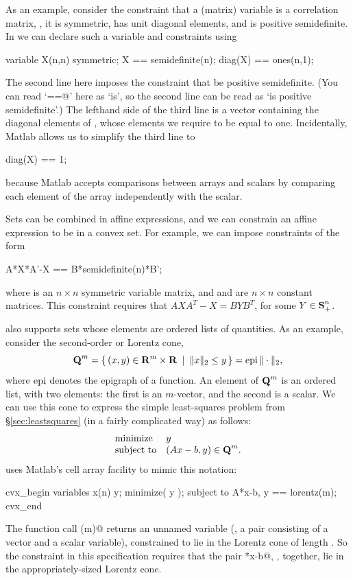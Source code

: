 \documentclass[12pt]{article}
\newcommand{\symm}{{\mbox{\bf S}}}  %
\newcommand{\lorentz}{{\mbox{\bf Q}}}  %
\begin{document}
As an example, consider the constraint
that a (matrix) variable \verb@X@ is a correlation
matrix, \ie, it is symmetric, has unit diagonal elements, and 
is positive semidefinite.  In \cvx we can declare such a variable
and constraints using
\begin{code}
	variable X(n,n) symmetric;
	X == semidefinite(n);
	diag(X) == ones(n,1);
\end{code}
The second line here imposes the constraint that \verb@X@
be positive semidefinite.
(You can read `\verb@==@' here as `is', so the second line can be 
read as `\verb@X@ is positive semidefinite'.)
The lefthand side of the third line
is a vector containing the diagonal elements of \verb@X@, whose 
elements we require to be equal to one. Incidentally, Matlab
allows us to simplify the third line to
\begin{code}
	diag(X) == 1;
\end{code}
because Matlab accepts comparisons between arrays and scalars
by comparing each element of the array independently with the scalar.

Sets can be combined in affine expressions, and we can constrain
an affine expression to be in a convex set.
For example, we can impose constraints of the form
\begin{code}
	A*X*A'-X == B*semidefinite(n)*B';
\end{code}
where \verb@X@ is an $n \times n$ symmetric variable matrix,
and \verb@A@ and \verb@B@ are $n \times n$  constant matrices.
This constraint requires that $AXA^T-X=BYB^T$, 
for some $Y \in \symm^n_+$.

\cvx also supports sets whose elements are ordered
lists of quantities.  As an example, consider the second-order or 
Lorentz cone,
\begin{equation}
	\lorentz^m = \Condset{ (x,y) \in \R^m\times\R }{ \| x \|_2 \leq y } = \epi \|\cdot\|_2,
\end{equation}
where $\operatorname{epi}$ denotes the epigraph of a function.
An element of $\lorentz^m$ is an ordered list, with two elements:
the first is an $m$-vector, and the second is a scalar.
We can use this cone to express the simple least-squares problem 
from \S\ref{sec:leastsquares} (in a fairly complicated way)
as follows:
\begin{equation}
	\begin{array}{ll}
		\text{minimize}   & y \\
		\text{subject to} & ( A x - b, y ) \in \lorentz^m.
	\end{array}
\end{equation}
\cvx uses Matlab's cell array facility to mimic this notation:
\begin{code}
	cvx_begin
	    variables x(n) y;
	    minimize( y );
	    subject to
	        { A*x-b, y } == lorentz(m);
	cvx_end
\end{code}
The function call \verb@lorentz(m)@ returns
an unnamed variable (\ie, a pair consisting of a vector and a 
scalar variable),
constrained to lie in the Lorentz cone of length \verb@m@. 
So the constraint in this
specification requires that the pair \verb@A*x-b@, \verb@y@, together, 
lie in the appropriately-sized Lorentz cone.
\end{document}
